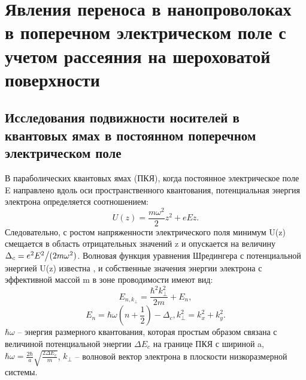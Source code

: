 \chapter{Явления переноса в нанопроволоках в поперечном электрическом поле с учетом рассеяния на шероховатой поверхности} \label{chapt4}

\section{Исследования подвижности носителей в квантовых ямах в постоянном поперечном электрическом поле} \label{sect4_1}

В параболических квантовых ямах (ПКЯ), когда постоянное электрическое поле E направлено вдоль оси пространственного квантования, потенциальная энергия электрона определяется соотношением:
\[
U(z)=\frac{m\omega ^{2} }{2} z^{2} +eEz.
\] 
Следовательно, с ростом напряженности электрического поля минимум U(z) смещается в область отрицательных значений z и опускается на величину $\Delta _{c} ={e^{2} E^{2}  \mathord{\left/{\vphantom{e^{2} E^{2}  (2m\omega ^{2} }}\right.\kern-\nulldelimiterspace} (2m\omega ^{2} } )$. Волновая функция уравнения Шредингера с потенциальной энергией U(z) известна \cite{Sinyavskii1998}, и собственные значения энергии электрона с эффективной массой m в зоне проводимости имеют вид:
\begin{equation} \label{eq:41_10}
E_{n,k_{\bot } } =\frac{\hbar ^{2} k_{\bot } ^{2} }{2m} +E_{n},
\end{equation}
\[
E_{n} =\hbar \omega \left(n+\frac{1}{2} \right)-\Delta _{c} , k_{\bot }^{2} =k_{x}^{2} +k_{y}^{2}.
\] 
$\hbar \omega $ -- энергия размерного квантования, которая простым образом связана с величиной потенциальной энергии $\Delta E_{c} $ на границе ПКЯ с шириной a, $\hbar \omega =\frac{2\hbar }{a} \sqrt{\frac{2\Delta E_{c} }{m} } $, $k_{\bot } $ -- волновой вектор электрона в плоскости низкоразмерной системы.

